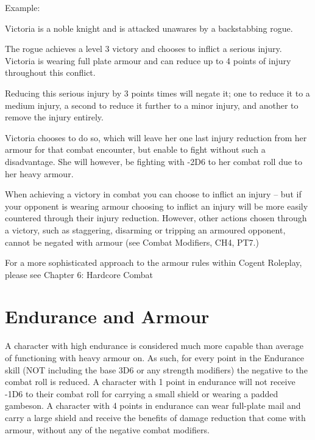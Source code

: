 Example:

\begin{displayquote}
    Victoria is a noble knight and is attacked unawares by a backstabbing rogue.

    The rogue achieves a level 3 victory and chooses to inflict a serious injury. Victoria is wearing full plate armour and can reduce up to 4 points of injury throughout this conflict.

    Reducing this serious injury by 3 points times will negate it; one to reduce it to a medium injury, a second to reduce it further to a minor injury, and another to remove the injury entirely.

    Victoria chooses to do so, which will leave her one last injury reduction from her armour for that combat encounter, but enable to fight without such a disadvantage. She will however, be fighting with -2D6 to her combat roll due to her heavy armour.
\end{displayquote}

When achieving a victory in combat you can choose to inflict an injury – but if your opponent is wearing armour choosing to inflict an injury will be more easily countered through their injury reduction. However, other actions chosen through a victory, such as staggering, disarming or tripping an armoured opponent, cannot be negated with armour (see Combat Modifiers, CH4, PT7.)

For a more sophisticated approach to the armour rules within Cogent Roleplay, please see Chapter 6: Hardcore Combat

\section{Endurance and Armour} \label{sec:endurance_and_armour}

A character with high endurance is considered much more capable than average of functioning with heavy armour on. As such, for every point in the Endurance skill (NOT including the base 3D6 or any strength modifiers) the negative to the combat roll is reduced. A character with 1 point in endurance will not receive -1D6 to their combat roll for carrying a small shield or wearing a padded gambeson. A character with 4 points in endurance can wear full-plate mail and carry a large shield and receive the benefits of damage reduction that come with armour, without any of the negative combat modifiers.